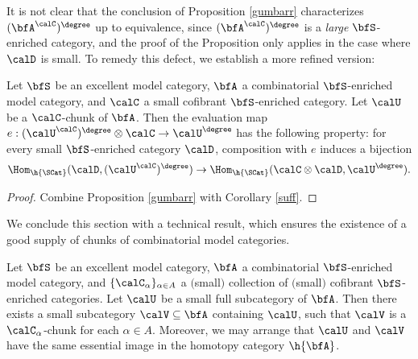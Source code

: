 It is not clear that the conclusion of Proposition \ref{gumbarr} characterizes
$(\bfA^{\calC})^{\degree}$ up to equivalence, since
$(\bfA^{\calC})^{\degree}$ is a {\em large} $\bfS$-enriched category, and the
proof of the Proposition only applies in the case where $\calD$ is small.
To remedy this defect, we establish a more refined version:

\begin{corollary}\label{sniffle}
Let $\bfS$ be an excellent model category, $\bfA$ a combinatorial $\bfS$-enriched model category,
and $\calC$ a small cofibrant $\bfS$-enriched category. Let $\calU$ be a
$\calC$-chunk of $\bfA$. 
Then the evaluation map
$e: ( \calU^{\calC})^{\degree} \otimes \calC \rightarrow \calU^{\degree}$ has
the following property: for every small $\bfS$-enriched category $\calD$, 
composition with $e$ induces a bijection
$$ \Hom_{ \h{\SCat} }( \calD, (\calU^{\calC})^{\degree} )
\rightarrow \Hom_{ \h{\SCat} }( \calC \otimes \calD, \calU^{\degree} ).$$
\end{corollary}

\begin{proof}
Combine Proposition \ref{gumbarr} with Corollary \ref{suff}.
\end{proof}

We conclude this section with a technical result, which ensures the existence of a good supply of chunks of combinatorial model categories. 

\begin{lemma}\label{exchunk}
Let $\bfS$ be an excellent model category, $\bfA$ a combinatorial $\bfS$-enriched model category,
and $\{ \calC_\alpha \}_{ \alpha \in A}$ a $($small$)$ collection of $($small$)$ cofibrant
$\bfS$-enriched categories. Let $\calU$ be a small full subcategory of $\bfA$.
Then there exists a small subcategory $\calV \subseteq \bfA$ containing $\calU$, such
that $\calV$ is a $\calC_{\alpha}$-chunk for each $\alpha \in A$. Moreover, we may arrange
that $\calU$ and $\calV$ have the same essential image in the homotopy category
$\h{\bfA}$. 
\end{lemma}

